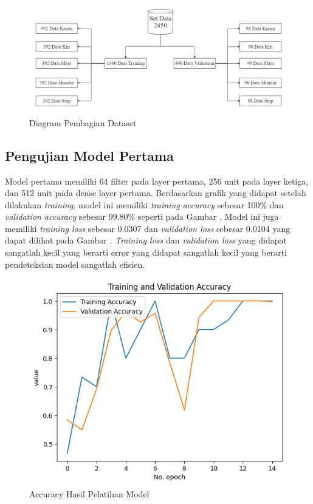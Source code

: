 \begin{figure}[H]
  \centering
  \includegraphics[scale=0.5]{gambar/pembagiandataset.jpg}
  \caption{Diagram Pembagian Dataset}
  \label{fig:pembagiandataset}
\end{figure}


\subsection{Pengujian Model Pertama}
Model pertama memiliki 64 filter pada layer pertama, 256 unit pada layer ketiga, dan 512 unit pada dense layer pertama. Berdasarkan grafik yang didapat setelah dilakukan \emph{training}, model ini memiliki \emph{training accuracy} sebesar 100\% dan \emph{validation accuracy} sebesar 99.80\% seperti pada Gambar . Model ini juga memiliki \emph{training loss} sebesar 0.0307 dan \emph{validation loss} sebesar 0.0104 yang dapat dilihat pada Gambar . \emph{Training loss} dan \emph{validation loss} yang didapat sangatlah kecil yang berarti error yang didapat sangatlah kecil yang berarti pendeteksian model sangatlah efisien.

\begin{figure}[H]
  \centering
  \includegraphics[scale=0.7]{gambar/normal accuracy.png}
  \caption{Accuracy Hasil Pelatihan Model}
  \label{fig:AccuracyHasilPelatihanModel}
\end{figure}


